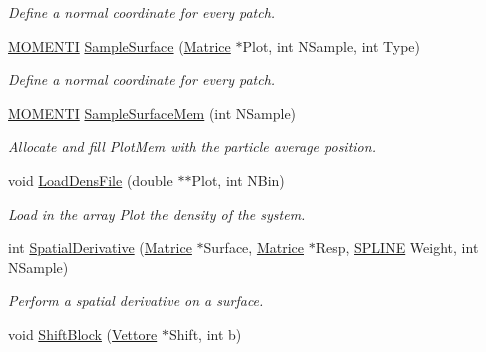 \begin{DoxyCompactItemize}
\begin{DoxyCompactList}\small\item\em \-Define a normal coordinate for every patch. \end{DoxyCompactList}\item 
\hypertarget{classVarData_a08ba09477a7030851fe661865a926019}{\hyperlink{structMOMENTI}{\-M\-O\-M\-E\-N\-T\-I} \hyperlink{classVarData_a08ba09477a7030851fe661865a926019}{\-Sample\-Surface} (\hyperlink{classMatrice}{\-Matrice} $\ast$\-Plot, int \-N\-Sample, int \-Type)}\label{classVarData_a08ba09477a7030851fe661865a926019}

\begin{DoxyCompactList}\small\item\em \-Define a normal coordinate for every patch. \end{DoxyCompactList}\item 
\hypertarget{classVarData_ac4c0e38f73d520530288e3195983d71e}{\hyperlink{structMOMENTI}{\-M\-O\-M\-E\-N\-T\-I} \hyperlink{classVarData_ac4c0e38f73d520530288e3195983d71e}{\-Sample\-Surface\-Mem} (int \-N\-Sample)}\label{classVarData_ac4c0e38f73d520530288e3195983d71e}

\begin{DoxyCompactList}\small\item\em \-Allocate and fill \-Plot\-Mem with the particle average position. \end{DoxyCompactList}\item 
\hypertarget{classVarData_aae93aa599f6d47f4656e7e995ffc8ef0}{void \hyperlink{classVarData_aae93aa599f6d47f4656e7e995ffc8ef0}{\-Load\-Dens\-File} (double $\ast$$\ast$\-Plot, int \-N\-Bin)}\label{classVarData_aae93aa599f6d47f4656e7e995ffc8ef0}

\begin{DoxyCompactList}\small\item\em \-Load in the array \-Plot the density of the system. \end{DoxyCompactList}\item 
\hypertarget{classVarData_a5d41a4adc43927d71fa72494b0a989ce}{int \hyperlink{classVarData_a5d41a4adc43927d71fa72494b0a989ce}{\-Spatial\-Derivative} (\hyperlink{classMatrice}{\-Matrice} $\ast$\-Surface, \hyperlink{classMatrice}{\-Matrice} $\ast$\-Resp, \hyperlink{structSPLINE}{\-S\-P\-L\-I\-N\-E} \-Weight, int \-N\-Sample)}\label{classVarData_a5d41a4adc43927d71fa72494b0a989ce}

\begin{DoxyCompactList}\small\item\em \-Perform a spatial derivative on a surface. \end{DoxyCompactList}\item 
\hypertarget{classVarData_a366bfde743eb134002b75d4a983f93e6}{void \hyperlink{classVarData_a366bfde743eb134002b75d4a983f93e6}{\-Shift\-Block} (\hyperlink{classVettore}{\-Vettore} $\ast$\-Shift, int b)}\label{classVarData_a366bfde743eb134002b75d4a983f93e6}


\end{DoxyCompactItemize}
